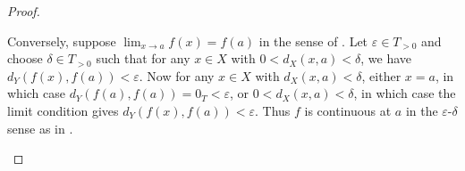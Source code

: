 \begin{proof}
\begin{enumerate}
        Conversely, suppose $\lim_{x \to a} f(x) = f(a)$ in the sense of . Let $\varepsilon \in T_{>0}$ and choose $\delta \in T_{>0}$ such that for any $x \in X$ with $0 < d_X(x,a) < \delta$, we have $d_Y(f(x), f(a)) < \varepsilon$. Now for any $x \in X$ with $d_X(x,a) < \delta$, either $x = a$, in which case $d_Y(f(a), f(a)) = 0_T < \varepsilon$, or $0 < d_X(x,a) < \delta$, in which case the limit condition gives $d_Y(f(x), f(a)) < \varepsilon$. Thus $f$ is continuous at $a$ in the $\varepsilon$-$\delta$ sense as in .
    \end{enumerate}
\end{proof}